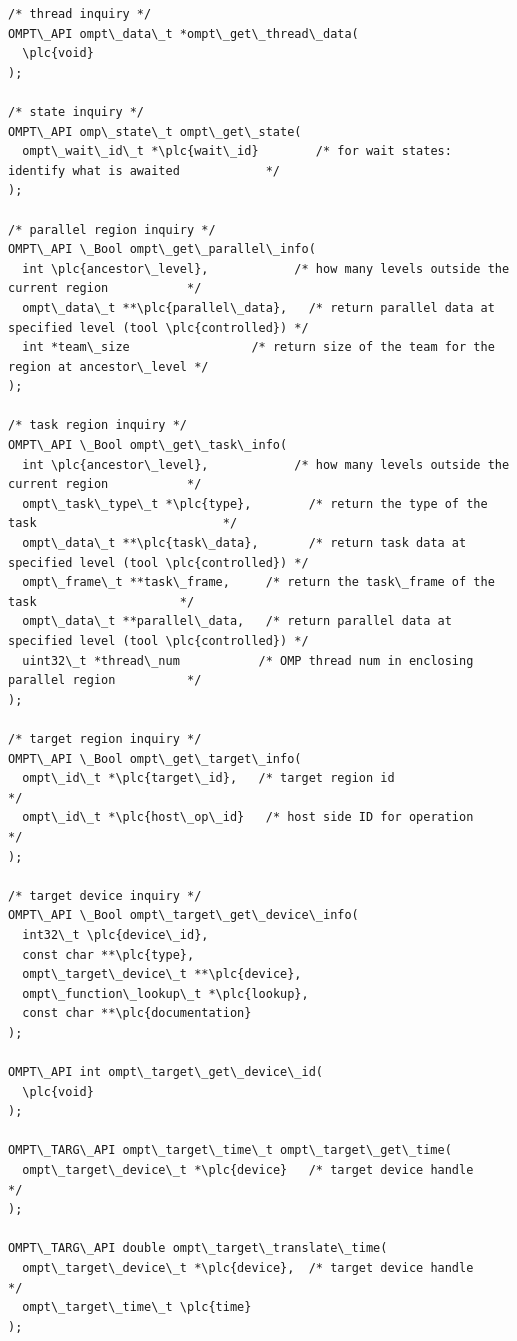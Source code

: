 \documentclass{article}
\begin{document}
\begin{boxedcode}
\begin{verbatim}
/* thread inquiry */
OMPT\_API ompt\_data\_t *ompt\_get\_thread\_data(
  \plc{void}
);

/* state inquiry */
OMPT\_API omp\_state\_t ompt\_get\_state( 
  ompt\_wait\_id\_t *\plc{wait\_id}        /* for wait states: identify what is awaited            */
);

/* parallel region inquiry */
OMPT\_API \_Bool ompt\_get\_parallel\_info(
  int \plc{ancestor\_level},            /* how many levels outside the current region           */
  ompt\_data\_t **\plc{parallel\_data},   /* return parallel data at specified level (tool \plc{controlled}) */
  int *team\_size                 /* return size of the team for the region at ancestor\_level */
);

/* task region inquiry */
OMPT\_API \_Bool ompt\_get\_task\_info(
  int \plc{ancestor\_level},            /* how many levels outside the current region           */
  ompt\_task\_type\_t *\plc{type},        /* return the type of the task                          */
  ompt\_data\_t **\plc{task\_data},       /* return task data at specified level (tool \plc{controlled}) */
  ompt\_frame\_t **task\_frame,     /* return the task\_frame of the task                    */
  ompt\_data\_t **parallel\_data,   /* return parallel data at specified level (tool \plc{controlled}) */
  uint32\_t *thread\_num           /* OMP thread num in enclosing parallel region          */
);

/* target region inquiry */
OMPT\_API \_Bool ompt\_get\_target\_info(
  ompt\_id\_t *\plc{target\_id},   /* target region id                                     */
  ompt\_id\_t *\plc{host\_op\_id}   /* host side ID for operation                           */
);

/* target device inquiry */
OMPT\_API \_Bool ompt\_target\_get\_device\_info(
  int32\_t \plc{device\_id}, 
  const char **\plc{type}, 
  ompt\_target\_device\_t **\plc{device},
  ompt\_function\_lookup\_t *\plc{lookup},
  const char **\plc{documentation}
);

OMPT\_API int ompt\_target\_get\_device\_id(
  \plc{void}
);

OMPT\_TARG\_API ompt\_target\_time\_t ompt\_target\_get\_time( 
  ompt\_target\_device\_t *\plc{device}   /* target device handle                                 */
);

OMPT\_TARG\_API double ompt\_target\_translate\_time(
  ompt\_target\_device\_t *\plc{device},  /* target device handle                                 */
  ompt\_target\_time\_t \plc{time}
);


\end{verbatim}
\end{boxedcode}
\end{document}

